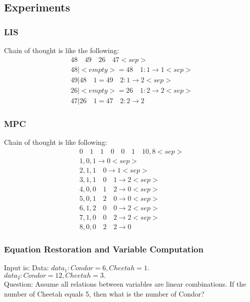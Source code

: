 \subsection{Experiments}
\subsubsection{LIS}
Chain of thought is like the following: 
\[
\begin{aligned}
    &48 \quad 49 \quad 26 \quad 47 <sep> \\
    &48 | <empty> = 48 \quad 1 : 1 \rightarrow 1 <sep>\\
    &49 | 48 \quad 1 = 49 \quad 2 : 1 \rightarrow 2 <sep> \\
    &26 | <empty> = 26 \quad 1 : 2 \rightarrow 2 <sep>\\
    &47 | 26 \quad 1 = 47 \quad 2 : 2 \rightarrow 2
    \end{aligned}
\]

\subsubsection{MPC}
Chain of thought is like following:
\[
\begin{aligned}
 &0 \quad 1 \quad 1 \quad 0 \quad 0 \quad 1 \quad 1 0 , 8 <sep> \\
 &1 , 0 , 1 \rightarrow 0 <sep> \\
 &2 , 1 , 1 \quad 0 \rightarrow 1 <sep> \\
 &3 , 1 , 1 \quad 0 \quad 1 \rightarrow 2 <sep> \\
 &4 , 0 , 0 \quad 1 \quad 2 \rightarrow 0 <sep> \\
 &5 , 0 , 1 \quad 2 \quad 0 \rightarrow 0 <sep> \\
 &6 , 1 , 2 \quad 0 \quad 0 \rightarrow 2 <sep> \\
 &7 , 1 , 0 \quad 0 \quad 2 \rightarrow 2 <sep> \\
 &8 , 0 , 0 \quad 2 \quad 2 \rightarrow 0
\end{aligned}
\]
\subsubsection{Equation Restoration and Variable Computation}
Input is:
Data:
$data_1: Condor = 6, Cheetah = 1.$ \\
$data_2: Condor = 12, Cheetah = 3.$ \\
Question:
Assume all relations between variables are linear combinations. If the number of Cheetah equals 5, then what is the number of Condor?


